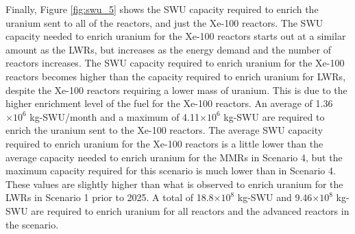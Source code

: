 Finally, Figure \ref{fig:swu_5} shows the \gls{SWU} capacity required
to enrich the uranium sent to all of the reactors, and just the Xe-100
reactors. The \gls{SWU} capacity needed 
to enrich uranium for the Xe-100 reactors starts out at a similar 
amount as the \glspl{LWR}, but 
increases as the energy demand and the number of reactors increases. 
The \gls{SWU} capacity required to enrich uranium 
for the Xe-100 reactors becomes higher than the capacity 
required to enrich uranium for \glspl{LWR}, despite the Xe-100 
reactors requiring a lower mass of uranium. This is due to the higher 
enrichment level of the fuel for the Xe-100 reactors. An average of 
1.36$\times 10^6$ kg-\gls{SWU}/month and a maximum of 
4.11$\times 10^6$ kg-\gls{SWU} are required to enrich the uranium sent 
to the Xe-100 reactors. The average \gls{SWU} capacity 
required to enrich uranium for the Xe-100 reactors is a little lower 
than the average capacity needed to enrich uranium for the \glspl{MMR}
in Scenario 4, but the maximum capacity required for this scenario is much 
lower than in Scenario 4. These values are slightly higher 
than what is observed to enrich uranium for the \glspl{LWR} in Scenario 1
prior to 2025. A total of 18.8$\times 10^8$ kg-SWU and 9.46$\times 10^8$
kg-SWU are required to enrich uranium for all reactors and the advanced 
reactors in the scenario.  

